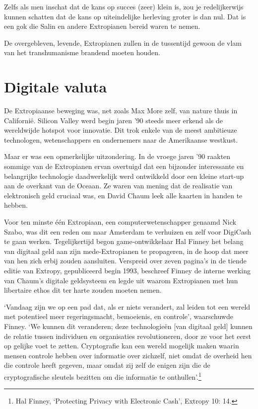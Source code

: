 \documentclass[smalldemyvopaper,11pt,twoside,onecolumn,openright,extrafontsizes,hidelinks]{memoir}
\begin{document}
Zelfs als men inschat dat de kans op succes (zeer) klein is, zou je
redelijkerwijs kunnen schatten dat de kans op uiteindelijke herleving
groter is dan nul. Dat is een gok die Salin en andere Extropianen bereid
waren te nemen.

De overgebleven, levende, Extropianen zullen in de tussentijd gewoon de
vlam van het transhumanisme brandend moeten houden.

\section{Digitale valuta}\label{digitale-valuta}

De Extropiaanse beweging was, net zoals Max More zelf, van nature thuis
in Californië. Silicon Valley werd begin jaren '90 steeds meer erkend
als de wereldwijde hotspot voor innovatie. Dit trok enkele van de meest
ambitieuze technologen, wetenschappers en ondernemers naar de
Amerikaanse westkust.

Maar er was een opmerkelijke uitzondering. In de vroege jaren '90
raakten sommige van de Extropianen ervan overtuigd dat een bijzonder
interessante en belangrijke technologie daadwerkelijk werd ontwikkeld
door een kleine start-up aan de overkant van de Oceaan. Ze waren van
mening dat de realisatie van elektronisch geld cruciaal was, en David
Chaum leek alle kaarten in handen te hebben.

Voor ten minste één Extropiaan, een computerwetenschapper genaamd Nick
Szabo, was dit een reden om naar Amsterdam te verhuizen en zelf voor
DigiCash te gaan werken. Tegelijkertijd begon game-ontwikkelaar Hal
Finney het belang van digitaal geld aan zijn mede-Extropianen te
propageren, in de hoop dat meer van hen zich erbij zouden aansluiten.
Verspreid over zeven pagina's in de tiende editie van Extropy,
gepubliceerd begin 1993, beschreef Finney de interne werking van Chaum's
digitale geldsysteem en legde uit waarom Extropianen met hun libertaire
ethos dit ter harte zouden moeten nemen.

`Vandaag zijn we op een pad dat, als er niets verandert, zal leiden tot
een wereld met potentieel meer regeringsmacht, bemoeienis, en controle',
waarschuwde Finney. `We kunnen dit veranderen; deze technologieën {[}van
digitaal geld{]} kunnen de relatie tussen individuen en organisaties
revolutioneren, door ze voor het eerst op gelijke voet te zetten.
Cryptografie kan een wereld mogelijk maken waarin mensen controle hebben
over informatie over zichzelf, niet omdat de overheid hen die controle
heeft gegeven, maar omdat zij zelf de enigen zijn die de cryptografische
sleutels bezitten om die informatie te onthullen'.\footnote{Hal Finney,
  `Protecting Privacy with Electronic Cash', Extropy 10: 14.}
\end{document}
